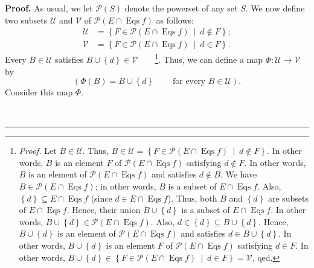\documentclass[numbers=enddot,12pt,final,onecolumn,notitlepage]{scrartcl}%
\theoremstyle{definition}
\newenvironment{proof}[1][Proof]{\noindent\textbf{#1.} }{\ \rule{0.5em}{0.5em}}
\newenvironment{verlong}{}{}
\begin{document}
\begin{verlong}
\begin{proof}
As usual, we let $\mathcal{P}\left(  S\right)  $ denote the powerset of any
set $S$. We now define two subsets $\mathcal{U}$ and $\mathcal{V}$ of
$\mathcal{P}\left(  E\cap\operatorname*{Eqs}f\right)  $ as follows:%
\begin{align*}
\mathcal{U}  &  =\left\{  F\in\mathcal{P}\left(  E\cap\operatorname*{Eqs}%
f\right)  \ \mid\ d\notin F\right\}  ;\\
\mathcal{V}  &  =\left\{  F\in\mathcal{P}\left(  E\cap\operatorname*{Eqs}%
f\right)  \ \mid\ d\in F\right\}  .
\end{align*}
Every $B\in\mathcal{U}$ satisfies $B\cup\left\{  d\right\}  \in\mathcal{V}%
$\ \ \ \ \footnote{\textit{Proof.} Let $B\in\mathcal{U}$. Thus, $B\in
\mathcal{U}=\left\{  F\in\mathcal{P}\left(  E\cap\operatorname*{Eqs}f\right)
\ \mid\ d\notin F\right\}  $. In other words, $B$ is an element $F$ of
$\mathcal{P}\left(  E\cap\operatorname*{Eqs}f\right)  $ satisfying $d\notin
F$. In other words, $B$ is an element of $\mathcal{P}\left(  E\cap
\operatorname*{Eqs}f\right)  $ and satisfies $d\notin B$. We have
$B\in\mathcal{P}\left(  E\cap\operatorname*{Eqs}f\right)  $; in other words,
$B$ is a subset of $E\cap\operatorname*{Eqs}f$. Also, $\left\{  d\right\}
\subseteq E\cap\operatorname*{Eqs}f$ (since $d\in E\cap\operatorname*{Eqs}f$).
Thus, both $B$ and $\left\{  d\right\}  $ are subsets of $E\cap
\operatorname*{Eqs}f$. Hence, their union $B\cup\left\{  d\right\}  $ is a
subset of $E\cap\operatorname*{Eqs}f$. In other words, $B\cup\left\{
d\right\}  \in\mathcal{P}\left(  E\cap\operatorname*{Eqs}f\right)  $. Also,
$d\in\left\{  d\right\}  \subseteq B\cup\left\{  d\right\}  $. Hence,
$B\cup\left\{  d\right\}  $ is an element of $\mathcal{P}\left(
E\cap\operatorname*{Eqs}f\right)  $ and satisfies $d\in B\cup\left\{
d\right\}  $. In other words, $B\cup\left\{  d\right\}  $ is an element $F$ of
$\mathcal{P}\left(  E\cap\operatorname*{Eqs}f\right)  $ satisfying $d\in F$.
In other words, $B\cup\left\{  d\right\}  \in\left\{  F\in\mathcal{P}\left(
E\cap\operatorname*{Eqs}f\right)  \ \mid\ d\in F\right\}  =\mathcal{V}$,
qed.}. Thus, we can define a map $\Phi:\mathcal{U}\rightarrow\mathcal{V}$ by%
\[
\left(  \Phi\left(  B\right)  =B\cup\left\{  d\right\}
\ \ \ \ \ \ \ \ \ \ \text{for every }B\in\mathcal{U}\right)  .
\]
Consider this map $\Phi$.


\end{proof}
\end{verlong}
\end{document}
